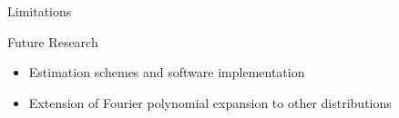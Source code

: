 \begin{frame}{Limitations}
    
\end{frame}

\begin{frame}{Future Research}
    \begin{itemize}
        \item Estimation schemes and software implementation
        \item Extension of Fourier polynomial expansion to other distributions
    \end{itemize}
\end{frame}